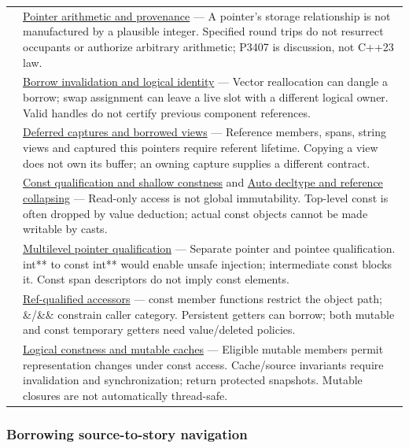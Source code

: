 {\begin{longtable}[]{@{}
  >{\raggedright\arraybackslash}p{}
  >{\raggedright\arraybackslash}p{}@{}}
120 & \hyperref[appendix-6af5921bc853]{Pointer arithmetic and provenance} --- A pointer's storage relationship is not manufactured by a plausible integer. Specified round trips do not resurrect occupants or authorize arbitrary arithmetic; P3407 is discussion, not C++23 law. \\
121 & \hyperref[appendix-f9b8b9188c7f]{Borrow invalidation and logical identity} --- Vector reallocation can dangle a borrow; swap assignment can leave a live slot with a different logical owner. Valid handles do not certify previous component references. \\
122 & \hyperref[appendix-aea529eb5175]{Deferred captures and borrowed views} --- Reference members, spans, string views and captured this pointers require referent lifetime. Copying a view does not own its buffer; an owning capture supplies a different contract. \\
123 & \hyperref[appendix-c25d60fed375]{Const qualification and shallow constness} and \hyperref[appendix-5d4252a42886]{Auto decltype and reference collapsing} --- Read-only access is not global immutability. Top-level const is often dropped by value deduction; actual const objects cannot be made writable by casts. \\
124 & \hyperref[appendix-5e1a7561cd98]{Multilevel pointer qualification} --- Separate pointer and pointee qualification. int** to const int** would enable unsafe injection; intermediate const blocks it. Const span descriptors do not imply const elements. \\
125 & \hyperref[appendix-d42039b1d6f7]{Ref-qualified accessors} --- const member functions restrict the object path; \&/\&\& constrain caller category. Persistent getters can borrow; both mutable and const temporary getters need value/deleted policies. \\
126 & \hyperref[appendix-f5593256bcaf]{Logical constness and mutable caches} --- Eligible mutable members permit representation changes under const access. Cache/source invariants require invalidation and synchronization; return protected snapshots. Mutable closures are not automatically thread-safe. \\
\end{longtable}
}

\subsubsection{Borrowing source-to-story navigation}\label{appendix-fd090d982a15-borrowing-source-to-story-navigation}

